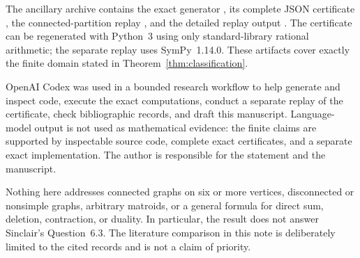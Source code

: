 \documentclass[11pt]{article}
\theoremstyle{remark}
\begin{document}
The ancillary archive contains the exact generator
, its complete JSON certificate
, the connected-partition replay
, and the detailed replay output
.  The certificate can be regenerated with
Python~3 using only standard-library rational arithmetic; the separate replay
uses SymPy~1.14.0.  These artifacts cover exactly the finite domain stated in
Theorem~\ref{thm:classification}.

OpenAI Codex was used in a bounded research workflow to help generate and
inspect code, execute the exact computations, conduct a separate replay of
the certificate, check bibliographic records, and draft this manuscript.
Language-model output is not used as mathematical evidence: the finite
claims are supported by inspectable source code, complete exact certificates,
and a separate exact implementation.  The author is responsible for the
statement and the manuscript.

Nothing here addresses connected graphs on six or more vertices,
disconnected or nonsimple graphs, arbitrary matroids, or a general formula
for direct sum, deletion, contraction, or duality.  In particular, the result
does not answer Sinclair's Question~6.3.  The literature comparison in this
note is deliberately limited to the cited records and is not a claim of
priority.

\printbibliography
\end{document}
